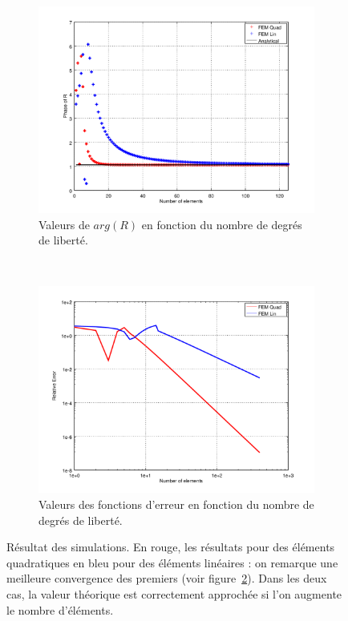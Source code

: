\begin{figure}[!ht]
	\centering
	\begin{subfigure}{0.48\textwidth}
		\includegraphics[width=\textwidth]{part1/figs/FEM/simuls_1D/phase.png}
		\caption{\label{fig:FEM1D:simuls:phase}Valeurs de $arg(R)$ en fonction du nombre de degrés de liberté.}
	\end{subfigure}~%
	\begin{subfigure}{0.48\textwidth}
		\includegraphics[width=\textwidth]{part1/figs/FEM/simuls_1D/convergence.png}
		\caption{\label{fig:FEM1D:simuls:convergence}Valeurs des fonctions d'erreur en fonction du nombre de degrés de liberté.}
\end{subfigure}
	\caption{\label{fig:FEM1D:simuls}Résultat des simulations. En rouge, les résultats pour des éléments quadratiques en bleu pour des éléments
	linéaires : on remarque une meilleure convergence des premiers (voir figure~\ref{fig:FEM1D:simuls:convergence}). Dans
	les deux cas, la valeur théorique est correctement approchée si l'on augmente le nombre d'éléments.}
\end{figure}

